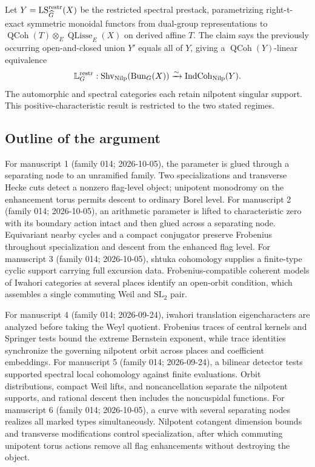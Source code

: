 \documentclass[11pt]{article}
\begin{document}
Let $Y=\operatorname{LS}_{\widehat G}^{\rm restr}(X)$ be the restricted spectral prestack, parametrizing right-t-exact symmetric monoidal functors from dual-group representations to $\operatorname{QCoh}(T)\otimes_E\operatorname{QLisse}_E(X)$ on derived affine $T$. The claim says the previously occurring open-and-closed union $Y'$ equals all of $Y$, giving a $\operatorname{QCoh}(Y)$-linear equivalence
\[
 \mathbb L_G^{\rm restr}:\operatorname{Shv}_{\rm Nilp}(\operatorname{Bun}_G(X))
 \xrightarrow{\sim}\operatorname{IndCoh}_{\rm Nilp}(Y).
\]
The automorphic and spectral categories each retain nilpotent singular support. This positive-characteristic result is restricted to the two stated regimes.

\subsection{Outline of the argument}
For manuscript 1 (family 014; 2026-10-05), the parameter is glued through a separating node to an unramified family. Two specializations and transverse Hecke cuts detect a nonzero flag-level object; unipotent monodromy on the enhancement torus permits descent to ordinary Borel level. For manuscript 2 (family 014; 2026-10-05), an arithmetic parameter is lifted to characteristic zero with its boundary action intact and then glued across a separating node. Equivariant nearby cycles and a compact conjugator preserve Frobenius throughout specialization and descent from the enhanced flag level. For manuscript 3 (family 014; 2026-10-05), shtuka cohomology supplies a finite-type cyclic support carrying full excursion data. Frobenius-compatible coherent models of Iwahori categories at several places identify an open-orbit condition, which assembles a single commuting Weil and $\mathrm{SL}_2$ pair.

For manuscript 4 (family 014; 2026-09-24), iwahori translation eigencharacters are analyzed before taking the Weyl quotient. Frobenius traces of central kernels and Springer tests bound the extreme Bernstein exponent, while trace identities synchronize the governing nilpotent orbit across places and coefficient embeddings. For manuscript 5 (family 014; 2026-09-24), a bilinear detector tests supported spectral local cohomology against finite evaluations. Orbit distributions, compact Weil lifts, and noncancellation separate the nilpotent supports, and rational descent then includes the noncuspidal functions. For manuscript 6 (family 014; 2026-10-05), a curve with several separating nodes realizes all marked types simultaneously. Nilpotent cotangent dimension bounds and transverse modifications control specialization, after which commuting unipotent torus actions remove all flag enhancements without destroying the object.
\end{document}
